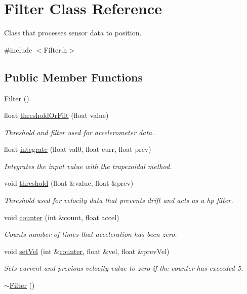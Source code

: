 \hypertarget{classFilter}{}\section{Filter Class Reference}
\label{classFilter}


Class that processes sensor data to position.  




{\ttfamily \#include $<$Filter.\+h$>$}

\subsection*{Public Member Functions}
\begin{DoxyCompactItemize}
\item 
\hyperlink{classFilter_ad15994c30d497afd567a6445446a249e}{Filter} ()
\item 
float \hyperlink{classFilter_a4cf317f524d27d1257dcd1defc55b60d}{threshold\+Or\+Filt} (float value)
\begin{DoxyCompactList}\small\item\em Threshold and filter used for accelerometer data. \end{DoxyCompactList}\item 
float \hyperlink{classFilter_a7cf738197eb1c4db4da770bb3caba0cc}{integrate} (float val0, float curr, float prev)
\begin{DoxyCompactList}\small\item\em Integrates the input value with the trapezoidal method. \end{DoxyCompactList}\item 
void \hyperlink{classFilter_a6a1278398f661776ec6e2d11c527efbd}{threshold} (float \&value, float \&prev)
\begin{DoxyCompactList}\small\item\em Threshold used for velocity data that prevents drift and acts as a hp filter. \end{DoxyCompactList}\item 
void \hyperlink{classFilter_af82d470c92431795b69c0bda29ceb534}{counter} (int \&count, float accel)
\begin{DoxyCompactList}\small\item\em Counts number of times that acceleration has been zero. \end{DoxyCompactList}\item 
void \hyperlink{classFilter_a37eff97b71271134bb8dce35947893d2}{set\+Vel} (int \&\hyperlink{classFilter_af82d470c92431795b69c0bda29ceb534}{counter}, float \&vel, float \&prev\+Vel)
\begin{DoxyCompactList}\small\item\em Sets current and previous velocity value to zero if the counter has exceeded 5. \end{DoxyCompactList}\item 
\hyperlink{classFilter_a502ee334d42eac3edbaf32b599f9c35e}{$\sim$\+Filter} ()
\end{DoxyCompactItemize}


